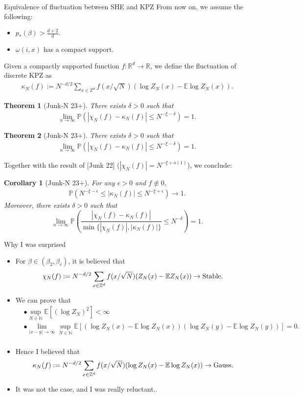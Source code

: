 \documentclass[10pt]{beamer}
\newtheorem{thm}{Theorem}
\newtheorem{cor}{Corollary}
\newcommand{\N}{\mathbb{N}}
\newcommand{\R}{\mathbb{R}}
\renewcommand{\P}{\mathbb{P
}}
\newcommand{\E}{\mathbb{E}}
\newcommand{\Z}{\mathbb{Z}}
\newcommand{\e}{\epsilon}
\def\al#1{\begin{align*}#1\end{align*}}
\begin{document}
\begin{frame}{Equivalence of fluctuation between SHE and KPZ}
From now on, we assume the following:
\begin{itemize}
    \item $p_*(\beta)>\frac{d+2}{d}$.
    \item $\omega(i,x)$ has a compact support.
\end{itemize}
     Given a compactly supported function $f:\R^d\to \R$, we define the fluctuation of discrete KPZ as
     \al{
     \kappa_N(f):= N^{-d/2}\sum_{x\in \Z^d}f(x/\sqrt{N}) (\log{Z_N(x)}-\E \log{Z_N(x)}).
     }
     \begin{thm}[Junk-N 23+]
There exists $\delta>0$ such that
    \begin{align*}
	\lim_{n\to\infty}\mathbb{P}(|\chi_N(f)-\kappa_N(f)|\leq N^{-\xi-\delta})=1.
\end{align*}
\end{thm}
\end{frame}
\begin{frame}

     \begin{thm}[Junk-N 23+]
There exists $\delta>0$ such that
    \begin{align*}
	\lim_{n\to\infty}\mathbb{P}(|\chi_N(f)-\kappa_N(f)|\leq N^{-\xi-\delta})=1.
\end{align*}
\end{thm}
Together with the result of [Junk 22] ($|\chi_N(f)|=N^{-\xi+o(1)}$), we conclude:
\begin{cor}[Junk-N 23+]
For any $\e>0$ and $f\not\equiv 0$,
\al{
\mathbb{P}(N^{-\xi-\e}\leq |\kappa_N(f)|\leq N^{-\xi+\e})\to 1.
}
Moreover, there exists $\delta>0$ such that
$$\lim_{n\to\infty}\P\left(\frac{|\chi_N(f)-\kappa_N(f)|}{\min\{|\chi_N(f)|,|\kappa_N(f)|\}}\leq N^{-\delta}\right)=1.$$
\end{cor}
\end{frame}
\begin{frame}{Why I was surprised}
\begin{itemize}
    \item For $\beta\in(\beta_2,\beta_c)$, it is believed that
    $$ \chi_N(f):= N^{-d/2}\sum_{x\in \Z^d}f(x/\sqrt{N}) (Z_N(x)-\E Z_N(x)) \to {\rm Stable}.$$
    \item We can prove that
    \al{
    &\bullet \sup_{N\in\N} \E[(\log Z_N)^2]<\infty\\
    & \bullet \lim_{|x-y|\to\infty}\sup_{N\in\N} \E[(\log Z_N(x)-\E\log Z_N(x))( \log Z_N(y)-\E\log Z_N(y) )]=0.\\
    }
    \item Hence I believed that
    \al{
    \kappa_N(f):= N^{-d/2}\sum_{x\in \Z^d}f(x/\sqrt{N}) (\log Z_N(x)-\E \log Z_N(x)) \to {\rm Gauss}.
    }   \pause
    \item It was not the case, and I was really reluctant..
\end{itemize}
    
\end{frame}
\end{document}
